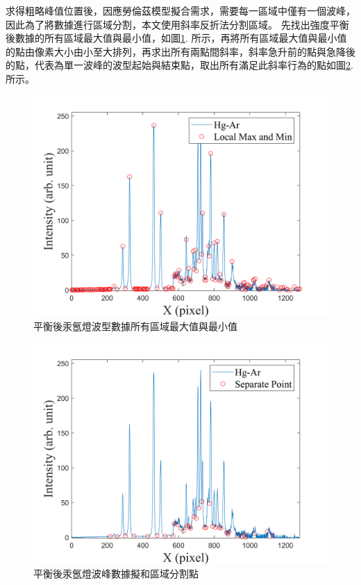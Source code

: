 求得粗略峰值位置後，因應勞倫茲模型擬合需求，需要每一區域中僅有一個波峰，因此為了將數據進行區域分割，本文使用斜率反折法分割區域。
先找出強度平衡後數據的所有區域最大值與最小值，如圖\ref{平衡後汞氬燈波型數據所有區域最大值與最小值}. 所示，再將所有區域最大值與最小值的點由像素大小由小至大排列，再求出所有兩點間斜率，斜率急升前的點與急降後的點，代表為單一波峰的波型起始與結束點，取出所有滿足此斜率行為的點如圖\ref{平衡後汞氬燈波峰數據擬和區域分割點}. 所示。
\begin{figure}[H] %
	\centering %
	\vspace{0.8cm}
	\includegraphics[width=16cm]{figures/combine_local_max_min.png} %
	\caption{平衡後汞氬燈波型數據所有區域最大值與最小值} %
	\label{平衡後汞氬燈波型數據所有區域最大值與最小值} %
\end{figure}
\begin{figure}[H] %
	\centering %
	\includegraphics[width=16cm]{figures/combine_sep.png} %
	\caption{平衡後汞氬燈波峰數據擬和區域分割點} %
	\label{平衡後汞氬燈波峰數據擬和區域分割點} %
\end{figure}
